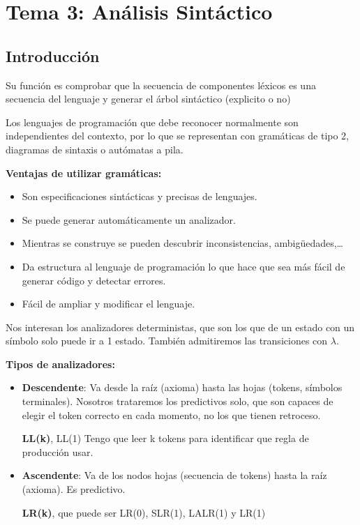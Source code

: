 \documentclass[12pt, twoside, openright]{report} %
\begin{document}
\chapter{Tema 3: Análisis Sintáctico}


\section{Introducción}

Su función es comprobar que la secuencia de componentes léxicos es una
secuencia del lenguaje y generar el árbol sintáctico (explicito o no)

Los lenguajes de programación que debe reconocer normalmente son
independientes del contexto, por lo que se representan con gramáticas de
tipo 2, diagramas de sintaxis o autómatas a pila.

\textbf{Ventajas de utilizar gramáticas:}

\begin{itemize}

\item
  Son especificaciones sintácticas y precisas de lenguajes.
\item
  Se puede generar automáticamente un analizador.
\item
  Mientras se construye se pueden descubrir inconsistencias,
  ambigüedades,\ldots{}
\item
  Da estructura al lenguaje de programación lo que hace que sea más
  fácil de generar código y detectar errores.
\item
  Fácil de ampliar y modificar el lenguaje.
\end{itemize}

Nos interesan los analizadores deterministas, que son los que de un
estado con un símbolo solo puede ir a 1 estado. También admitiremos las
transiciones con \(\lambda\).

\textbf{Tipos de analizadores:}

\begin{itemize}
\item \textbf{Descendente}: Va desde la raíz (axioma) hasta las hojas
  (tokens, símbolos terminales). Nosotros trataremos los predictivos
  solo, que son capaces de elegir el token correcto en cada momento, no
  los que tienen retroceso.

  \textbf{LL(k)}, LL(1) Tengo que leer k tokens para identificar que
  regla de producción usar.
\item \textbf{Ascendente}: Va de los nodos hojas (secuencia de tokens) hasta
  la raíz (axioma). Es predictivo.

  \textbf{LR(k)}, que puede ser LR(0), SLR(1), LALR(1) y LR(1)
\end{itemize}
\end{document}
